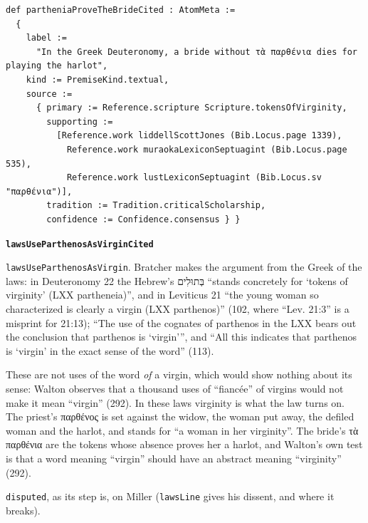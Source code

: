 \documentclass[11pt]{article}
\begin{document}
{\small\begin{verbatim}
def partheniaProveTheBrideCited : AtomMeta :=
  {
    label :=
      "In the Greek Deuteronomy, a bride without τὰ παρθένια dies for playing the harlot",
    kind := PremiseKind.textual,
    source :=
      { primary := Reference.scripture Scripture.tokensOfVirginity,
        supporting :=
          [Reference.work liddellScottJones (Bib.Locus.page 1339),
            Reference.work muraokaLexiconSeptuagint (Bib.Locus.page 535),
            Reference.work lustLexiconSeptuagint (Bib.Locus.sv "παρθένια")],
        tradition := Tradition.criticalScholarship,
        confidence := Confidence.consensus } }
\end{verbatim}}
\par\medskip\noindent\textbf{\texttt{laws\allowbreak{}Use\allowbreak{}Parthenos\allowbreak{}As\allowbreak{}Virgin\allowbreak{}Cited}}\par\nobreak\noindent
\texttt{laws\allowbreak{}Use\allowbreak{}Parthenos\allowbreak{}As\allowbreak{}Virgin}. Bratcher makes the argument from the Greek of the laws: in Deuteronomy 22 the Hebrew’s בְּתוּלִים “stands concretely for ‘tokens of virginity’ (LXX partheneia)”, and in Leviticus 21 “the young woman so characterized is clearly a virgin (LXX parthenos)” (102, where “Lev. 21:3” is a misprint for 21:13); “The use of the cognates of parthenos in the LXX bears out the conclusion that parthenos is ‘virgin’”, and “All this indicates that parthenos is ‘virgin’ in the exact sense of the word” (113).

These are not uses of the word \emph{of} a virgin, which would show nothing about its sense: Walton observes that a thousand uses of “fiancée” of virgins would not make it mean “virgin” (292). In these laws virginity is what the law turns on. The priest’s παρθένος is set against the widow, the woman put away, the defiled woman and the harlot, and stands for “a woman in her virginity”. The bride’s τὰ παρθένια are the tokens whose absence proves her a harlot, and Walton’s own test is that a word meaning “virgin” should have an abstract meaning “virginity” (292).

\texttt{disputed}, as its step is, on Miller (\texttt{laws\allowbreak{}Line} gives his dissent, and where it breaks).
\end{document}
